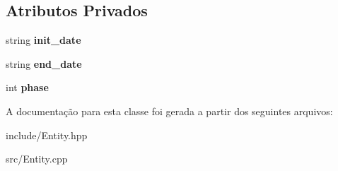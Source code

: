 \subsection*{Atributos Privados}
\begin{DoxyCompactItemize}
\item 
string {\bfseries init\+\_\+date}\hypertarget{classPhase_a40dc4b51a19f519fd9db6bb4cd8b58c6}{}\label{classPhase_a40dc4b51a19f519fd9db6bb4cd8b58c6}

\item 
string {\bfseries end\+\_\+date}\hypertarget{classPhase_a1cf1de158ae10caa61c900ea2d7e6e07}{}\label{classPhase_a1cf1de158ae10caa61c900ea2d7e6e07}

\item 
int {\bfseries phase}\hypertarget{classPhase_a299a23c52bce90ee5224976bc921ed6b}{}\label{classPhase_a299a23c52bce90ee5224976bc921ed6b}

\end{DoxyCompactItemize}


A documentação para esta classe foi gerada a partir dos seguintes arquivos\+:\begin{DoxyCompactItemize}
\item 
include/Entity.\+hpp\item 
src/Entity.\+cpp\end{DoxyCompactItemize}
